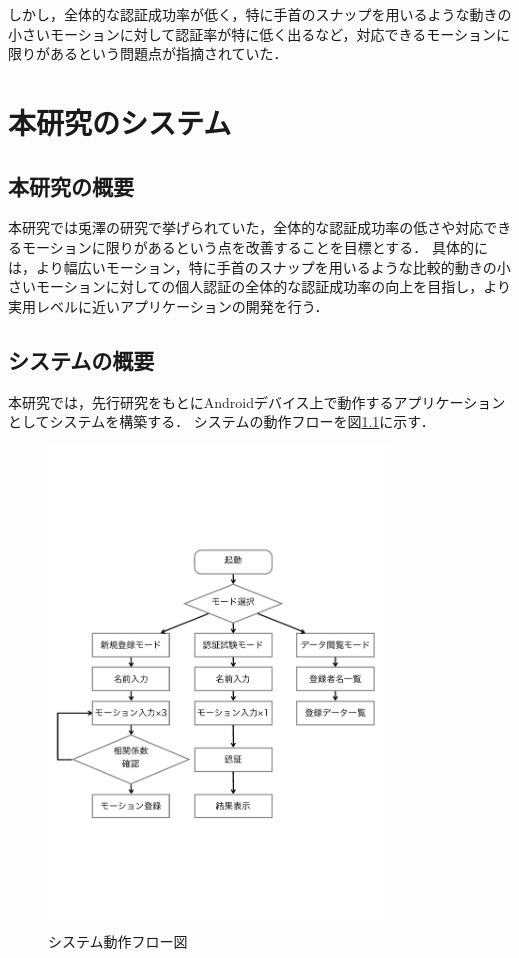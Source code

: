 \documentclass[11pt]{jreport}
\begin{document}
    しかし，全体的な認証成功率が低く，特に手首のスナップを用いるような動きの小さいモーションに対して認証率が特に低く出るなど，対応できるモーションに限りがあるという問題点が指摘されていた．

\chapter{本研究のシステム}
	\section{本研究の概要}
	本研究では兎澤の研究で挙げられていた，全体的な認証成功率の低さや対応できるモーションに限りがあるという点を改善することを目標とする．
    具体的には，より幅広いモーション，特に手首のスナップを用いるような比較的動きの小さいモーションに対しての個人認証の全体的な認証成功率の向上を目指し，より実用レベルに近いアプリケーションの開発を行う．

	\section{システムの概要}
	本研究では，先行研究をもとにAndroidデバイス上で動作するアプリケーションとしてシステムを構築する．
    システムの動作フローを図\ref{flow}に示す．

    \begin{figure}[btp]
        \begin{center}
            \includegraphics[width=9cm, bb=0 183 594 670]{Flow.pdf}
            \caption{システム動作フロー図}
            \label{flow}
        \end{center}
    \end{figure}
\end{document}

